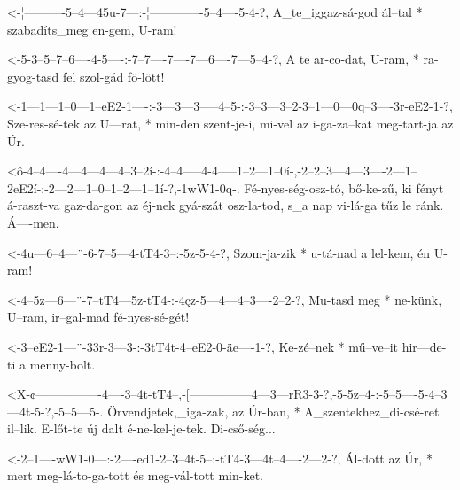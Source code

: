   {<-¦----------5--4---45u-7---:-¦-------------5--4----5-4-?,}
  {  A_te_iggaz-sá-god ál--tal * szabadíts_meg en-gem, U-ram!}

  {<-5-3--5--7--6----4-5----:-7--7----7----7---6----7---5--4-?,}
  {  A te ar-co-dat, U-ram, * ra-gyog-tasd fel szol-gád fö-lött!}

  {<-1---1---1--0---1--eE2-1----:-3---3---3-----4--5-:-3--3---3--2-3--1---0---0q--3----3r-eE2-1-?,}
  {  Sze-res-sé-tek az U---rat, * min-den szent-je-i,  mi-vel az i-ga-za--kat meg-tart-ja az  Úr.}


  {<ô-4--4----4---4---4---4--3--2í-:-4--4-----4-4-----1--2---1--0í-,-2--2--3---4---3----2---1--2eE2í-:-2---2---1--0--1--2---1--1í-?,-1wW1-0q-.}
  {   Fé-nyes-ség-osz-tó, bő-ke-zű,  ki fényt á-raszt-va gaz-da-gon  az éj-nek gyá-szát osz-la-tod,    s_a nap vi-lá-ga tűz le ránk. Á----men.}

  {<-4u---6--4---¨-6-7--5---4-tT4-3--:-5z-5-4-?,}
  {  Szom-ja-zik * u-tá-nad a lel-kem, én U-ram!}

  {<-4--5z---6---¨-7--tT4---5z-tT4-:-4çz-5---4---4--3----2--2-?,}
  {  Mu-tasd meg * ne-künk, U--ram,  ir--gal-mad fé-nyes-sé-gét!}

  {<-3--eE2-1---¨-33r-3---3-:-3tT4t-4--eE2-0-äe----1-?,}
  {  Ke-zé--nek * mű--ve--it  hir---de-ti  a menny-bolt.}

  {<X-¢----------------4----3--4t-tT4--,-[---------------4---3---rR3-3-?,-5-5z--4-:-5--5----5-4--3---4t-5-?,-5--5---5-.}
  {   Örvendjetek,_iga-zak, az Úr-ban, * A_szentekhez_di-csé-ret il--lik. E-lőt-te  új dalt é-ne-kel-je-tek. Di-cső-ség...}

  {<-2--1----wW1-0---:-2----ed1-2--3--4t-5--:-tT4-3---4t--4----2---2-?,}
  {  Ál-dott az  Úr, * mert meg-lá-to-ga-tott és  meg-vál-tott min-ket.}


